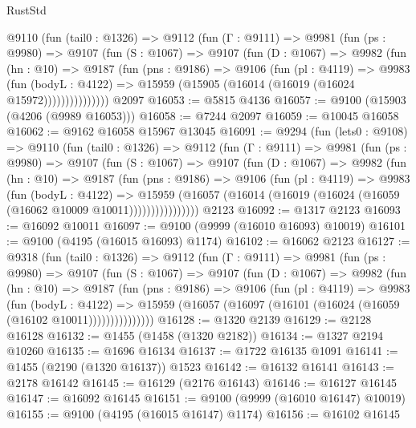 \begin{lexlean}{RustStd}
\begin{coremodule}
      @9110
        (fun (tail0 : @1326) =>
        @9112
          (fun (Γ : @9111) =>
          @9981
            (fun (ps : @9980) =>
            @9107
              (fun (S : @1067) =>
              @9107
                (fun (D : @1067) =>
                @9982
                  (fun (hn : @10) =>
                  @9187
                    (fun (pns : @9186) =>
                    @9106
                      (fun (pl : @4119) =>
                      @9983
                        (fun (bodyL : @4122) =>
                        @15959 (@15905 (@16014 (@16019 (@16024 @15972)))))))))))))))
    @2097
@16053 := @5815 @4136
@16057 := @9100 (@15903 (@4206 (@9989 @16053)))
@16058 := @7244 @2097
@16059 := @10045 @16058
@16062 := @9162 @16058 @15967 @13045
@16091 := @9294
    (fun (lets0 : @9108) =>
    @9110
      (fun (tail0 : @1326) =>
      @9112
        (fun (Γ : @9111) =>
        @9981
          (fun (ps : @9980) =>
          @9107
            (fun (S : @1067) =>
            @9107
              (fun (D : @1067) =>
              @9982
                (fun (hn : @10) =>
                @9187
                  (fun (pns : @9186) =>
                  @9106
                    (fun (pl : @4119) =>
                    @9983
                      (fun (bodyL : @4122) =>
                      @15959
                        (@16057
                          (@16014 (@16019 (@16024 (@16059 (@16062 @10009 @10011))))))))))))))))
    @2123
@16092 := @1317 @2123
@16093 := @16092 @10011
@16097 := @9100 (@9999 (@16010 @16093) @10019)
@16101 := @9100 (@4195 (@16015 @16093) @1174)
@16102 := @16062 @2123
@16127 := @9318
    (fun (tail0 : @1326) =>
    @9112
      (fun (Γ : @9111) =>
      @9981
        (fun (ps : @9980) =>
        @9107
          (fun (S : @1067) =>
          @9107
            (fun (D : @1067) =>
            @9982
              (fun (hn : @10) =>
              @9187
                (fun (pns : @9186) =>
                @9106
                  (fun (pl : @4119) =>
                  @9983
                    (fun (bodyL : @4122) =>
                    @15959 (@16057 (@16097 (@16101 (@16024 (@16059 (@16102 @10011)))))))))))))))
@16128 := @1320 @2139
@16129 := @2128 @16128
@16132 := @1455 (@1458 (@1320 @2182))
@16134 := @1327 @2194 @10260
@16135 := @1696 @16134
@16137 := @1722 @16135 @1091
@16141 := @1455 (@2190 (@1320 @16137)) @1523
@16142 := @16132 @16141
@16143 := @2178 @16142
@16145 := @16129 (@2176 @16143)
@16146 := @16127 @16145
@16147 := @16092 @16145
@16151 := @9100 (@9999 (@16010 @16147) @10019)
@16155 := @9100 (@4195 (@16015 @16147) @1174)
@16156 := @16102 @16145

\end{coremodule}
\end{lexlean}
